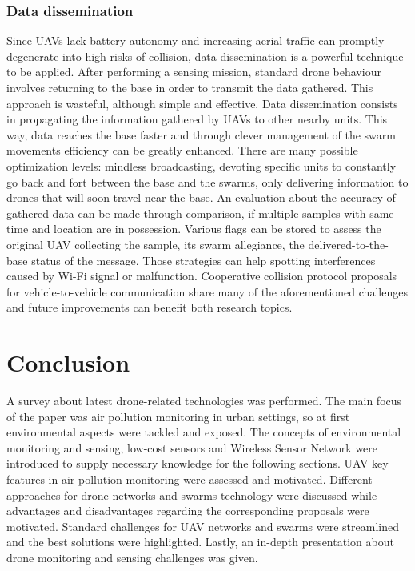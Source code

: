 \documentclass[journal]{IEEEtran}
\begin{document}
\subsubsection{Data dissemination}
Since UAVs lack battery autonomy and increasing aerial traffic can promptly degenerate into high risks of collision, data dissemination \cite{addsen} is a powerful technique to be applied. After performing a sensing mission, standard drone behaviour involves returning to the base in order to transmit the data gathered. This approach is wasteful, although simple and effective. Data dissemination consists in propagating the information gathered by UAVs to other nearby units. This way, data reaches the base faster and through clever management of the swarm movements efficiency can be greatly enhanced. There are many possible optimization levels: mindless broadcasting, devoting specific units to constantly go back and fort between the base and the swarms, only delivering information to drones that will soon travel near the base. An evaluation about the accuracy of gathered data can be made through comparison, if multiple samples with same time and location are in possession. Various flags can be stored to assess the original UAV collecting the sample, its swarm allegiance, the delivered-to-the-base status of the message. Those strategies can help spotting interferences caused by Wi-Fi signal or malfunction. Cooperative collision protocol proposals for vehicle-to-vehicle communication \cite{vehicleccp} share many of the aforementioned challenges and future improvements can benefit both research topics.


\section{Conclusion}
A survey about latest drone-related technologies was performed. The main focus of the paper was air pollution monitoring in urban settings, so at first environmental aspects were tackled and exposed. The concepts of environmental monitoring and sensing, low-cost sensors and Wireless Sensor Network were introduced to supply necessary knowledge for the following sections. UAV key features in air pollution monitoring were assessed and motivated. Different approaches for drone networks and swarms technology were discussed while advantages and disadvantages regarding the corresponding proposals were motivated. Standard challenges for UAV networks and swarms were streamlined and the best solutions were highlighted. Lastly, an in-depth presentation about drone monitoring and sensing challenges was given.
\end{document}
